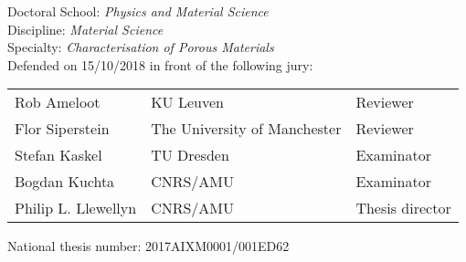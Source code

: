 \begin{titlepage}
\begin{flushleft}
	\vspace{0.2cm}
	\normalsize 
	Doctoral School: \textit{Physics and Material Science}\\
    Discipline: \textit{Material Science}\\
    Specialty: \textit{Characterisation of Porous Materials}\\
	\vspace{0.5cm}
    \normalsize Defended on 15/10/2018 in front of the following jury:\\
\end{flushleft}
\vspace{0.1cm}
\begin{tabular}{lll}
	Rob Ameloot & KU Leuven & Reviewer \\
    \vspace{0.08cm}
	Flor Siperstein & The University of Manchester & Reviewer \\
    \vspace{0.08cm}
	Stefan Kaskel & TU Dresden & Examinator \\
    \vspace{0.08cm}
	Bogdan Kuchta & CNRS/AMU & Examinator \\
    \vspace{0.08cm}
	Philip L. Llewellyn & CNRS/AMU & Thesis director \\
\end{tabular}
\vspace{0.3cm}
\begin{flushleft}\normalsize National thesis number: 2017AIXM0001/001ED62\\\end{flushleft}

\end{titlepage}